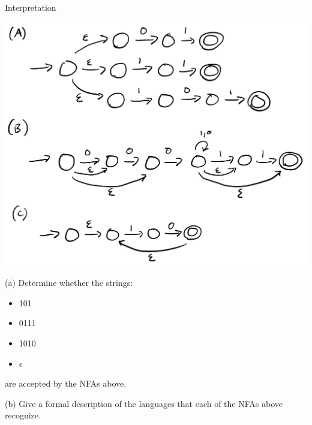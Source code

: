 \documentclass[11pt]{book}
\begin{document}
\begin{problem}{Interpretation}

\begin{center}
  \includegraphics[width=\textwidth]{nfas}
\end{center}

\noindent (a) Determine whether the strings:
\begin{itemize}
  \item 101
  \item 0111
  \item 1010
  \item \( \epsilon \)
\end{itemize}
are accepted by the NFAs above.

\vspace{1em}

\noindent (b) \turninproblem{} Give a formal description of the languages that
each of the NFAs above recognize.

\end{problem}
\end{document}
